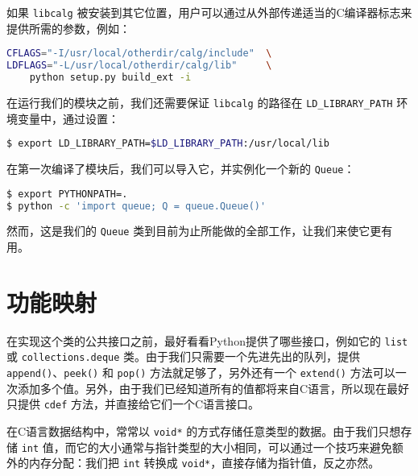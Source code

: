 \begin{translation}
如果 \lstinline{libcalg} 被安装到其它位置，用户可以通过从外部传递适当的C编译器标志来提供所需的参数，例如：

\begin{framed}
\begin{lstlisting}[language=sh]
CFLAGS="-I/usr/local/otherdir/calg/include"  \
LDFLAGS="-L/usr/local/otherdir/calg/lib"     \
    python setup.py build_ext -i
\end{lstlisting}
\end{framed}

在运行我们的模块之前，我们还需要保证 \lstinline{libcalg} 的路径在 \lstinline{LD_LIBRARY_PATH} 环境变量中，通过设置：

\begin{framed}
\begin{lstlisting}[language=sh]
$ export LD_LIBRARY_PATH=$LD_LIBRARY_PATH:/usr/local/lib
\end{lstlisting}
\end{framed}

在第一次编译了模块后，我们可以导入它，并实例化一个新的 \lstinline{Queue}：

\begin{framed}
\begin{lstlisting}[language=sh]
$ export PYTHONPATH=.
$ python -c 'import queue; Q = queue.Queue()'
\end{lstlisting}
\end{framed}

然而，这是我们的 \lstinline{Queue} 类到目前为止所能做的全部工作，让我们来使它更有用。

\section{功能映射}

在实现这个类的公共接口之前，最好看看Python提供了哪些接口，例如它的 \lstinline{list} 或 \lstinline{collections.deque} 类。由于我们只需要一个先进先出的队列，提供 \lstinline{append()}、\lstinline{peek()} 和 \lstinline{pop()} 方法就足够了，另外还有一个 \lstinline{extend()} 方法可以一次添加多个值。另外，由于我们已经知道所有的值都将来自C语言，所以现在最好只提供 \lstinline{cdef} 方法，并直接给它们一个C语言接口。

在C语言数据结构中，常常以 \lstinline{void*} 的方式存储任意类型的数据。由于我们只想存储 \lstinline{int} 值，而它的大小通常与指针类型的大小相同，可以通过一个技巧来避免额外的内存分配：我们把 \lstinline{int} 转换成 \lstinline{void*}，直接存储为指针值，反之亦然。


\end{translation}
